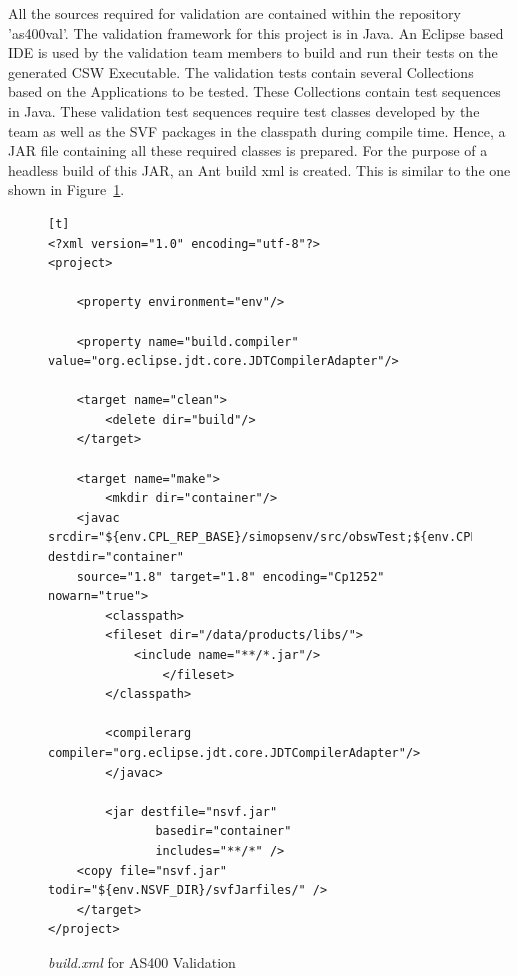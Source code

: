 \documentclass[12pt, a4paper, titlepage]{scrartcl}
\newcommand{\courierword}[1]{\textsf{\itshape #1}}{\fontfamily{pcr}\selectfont}%
\begin{document}
\par All the sources required for validation are contained within the repository 'as400val'. The validation framework for this project is in Java. An Eclipse based IDE is used by the validation team members to build and run their tests on the generated CSW Executable. The validation tests contain several Collections based on the Applications to be tested. These Collections contain test sequences in Java. These validation test sequences require test classes developed by the team as well as the SVF packages in the classpath during compile time. Hence, a JAR file containing all these required classes is prepared. For the purpose of a headless build of this JAR, an Ant build xml is created. This is similar to the one shown in Figure~\ref{fig:build-xml-validation}.

\begin{figure}[!ht]
\begin{lstlisting}[frame=single][t]
<?xml version="1.0" encoding="utf-8"?>
<project>

    <property environment="env"/>
    
    <property name="build.compiler" value="org.eclipse.jdt.core.JDTCompilerAdapter"/>

    <target name="clean">
        <delete dir="build"/>
    </target>

    <target name="make">
        <mkdir dir="container"/>
	<javac srcdir="${env.CPL_REP_BASE}/simopsenv/src/obswTest;${env.CPL_REP_BASE}/test/benchConfig" destdir="container" 
	source="1.8" target="1.8" encoding="Cp1252" nowarn="true">
		<classpath>
		<fileset dir="/data/products/libs/">
			<include name="**/*.jar"/>
			    </fileset>
		</classpath>
	 
		<compilerarg compiler="org.eclipse.jdt.core.JDTCompilerAdapter"/>
	    </javac>

	    <jar destfile="nsvf.jar"
		       basedir="container"
		       includes="**/*" />
	<copy file="nsvf.jar" todir="${env.NSVF_DIR}/svfJarfiles/" />
    </target>
</project>
\end{lstlisting}
\caption{\courierword{build.xml} for AS400 Validation}
\label{fig:build-xml-validation}
\end{figure} 
\end{document}
